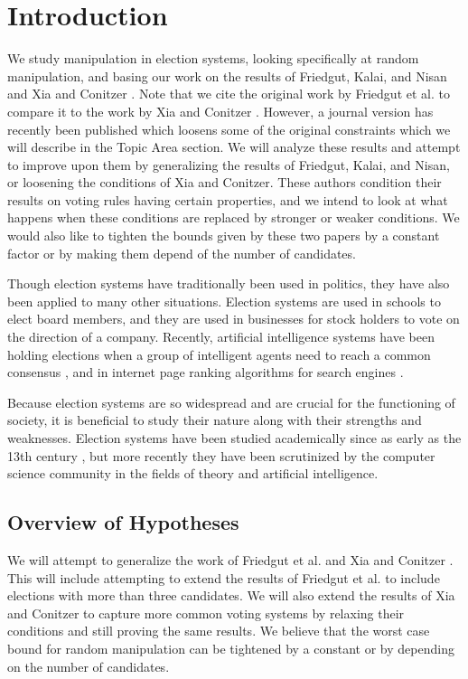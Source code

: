 
\chapter{Introduction}

We study manipulation in election systems, looking specifically at random manipulation, and basing our work on the results of Friedgut, Kalai, and Nisan \cite{friedgut2008elections} and Xia and Conitzer \cite{xia2008sufficient}. Note that we cite the original work by Friedgut et al. \cite{friedgut2008elections} to compare it to the work by Xia and Conitzer \cite{xia2008sufficient}. However, a journal version has recently been published which loosens some of the original constraints \cite{friedgut2011quantitative} which we will describe in the Topic Area section. We will analyze these results and attempt to improve upon them by generalizing the results of Friedgut, Kalai, and Nisan, or loosening the conditions of Xia and Conitzer.  These authors condition their results on voting rules having certain properties, and we intend to look at what happens when these conditions are replaced by stronger or weaker conditions. We would also like to tighten the bounds given by these two papers by a constant factor or by making them depend of the number of candidates.

Though election systems have traditionally been used in politics, they have also been applied to many other situations. Election systems are used in schools to elect board members, and they are used in businesses for stock holders to vote on the direction of a company. Recently, artificial intelligence systems have been holding elections when a group of intelligent agents need to reach a common consensus \cite{ephrati1991clarke, ephrati1993multi, pennock2000social, dwork2001rank, fagin2003efficient}, and in internet page ranking algorithms for search engines \cite{chevaleyre2007short}.

Because election systems are so widespread and are crucial for the functioning of society, it is beneficial to study their nature along with their strengths and weaknesses. Election systems have been studied academically since as early as the 13th century \cite{hägele2001llull}, but more recently they have been scrutinized by the computer science community in the fields of theory and artificial intelligence.


\section{Overview of Hypotheses}

We will attempt to generalize the work of Friedgut et al. \cite{friedgut2008elections} and Xia and Conitzer \cite{xia2008sufficient}. This will include attempting to extend the results of Friedgut et al. \cite{friedgut2008elections} to include elections with more than three candidates. We will also extend the results of Xia and Conitzer \cite{xia2008sufficient} to capture more common voting systems by relaxing their conditions and still proving the same results. We believe that the worst case bound for random manipulation can be tightened by a constant or by depending on the number of candidates.
